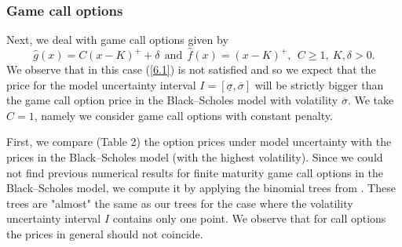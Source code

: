 \documentclass{amsart}
\numberwithin{equation}{section}
\begin{document}
\subsubsection*{Game call options}
Next, we deal with game call options given by
$$\hat g(x)=C(x-K)^{+}+\delta  \ \ \mbox{and} \ \  \hat f(x)=(x-K)^{+}, \ \ C\geq 1,\ K,\delta>0.$$
We observe that in this case (\ref{6.1}) is not satisfied and so we expect that the price for
the model uncertainty interval $I=[\underline{\sigma},\overline{\sigma}]$ will be strictly bigger than the game call option price in the Black--Scholes model with volatility
$\overline{\sigma}$.
We take $C=1$, namely we consider game call options with constant penalty.

First, we compare (Table 2) the option prices
under model uncertainty with the prices in the Black--Scholes model (with the highest volatility).
Since we could not find previous numerical results for finite maturity game call options
in the Black--Scholes model, we compute it by applying the binomial trees from
\cite{Ki1}.
These trees are "almost" the same as our trees for the case where the volatility uncertainty interval $I$ contains only one point.
We observe that for call options
the prices in general should not coincide.
\end{document}
